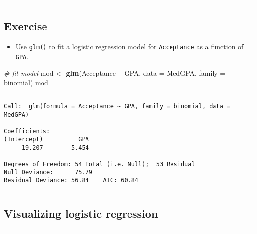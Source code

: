 \documentclass[
]{book}
\newenvironment{Shaded}{\begin{snugshade}}{\end{snugshade}}
\newcommand{\CommentTok}[1]{\textcolor[rgb]{0.56,0.35,0.01}{\textit{#1}}}
\newcommand{\DataTypeTok}[1]{\textcolor[rgb]{0.13,0.29,0.53}{#1}}
\newcommand{\KeywordTok}[1]{\textcolor[rgb]{0.13,0.29,0.53}{\textbf{#1}}}
\newcommand{\NormalTok}[1]{#1}
\newcommand{\OperatorTok}[1]{\textcolor[rgb]{0.81,0.36,0.00}{\textbf{#1}}}
\newcommand{\StringTok}[1]{\textcolor[rgb]{0.31,0.60,0.02}{#1}}
\providecommand{\tightlist}{%
  \setlength{\itemsep}{0pt}\setlength{\parskip}{0pt}}
\begin{document}
\begin{center}\rule{0.5\linewidth}{0.5pt}\end{center}

\hypertarget{exercise-14}{%
\subsection*{Exercise}\label{exercise-14}}

\begin{itemize}
\tightlist
\item
  Use \texttt{glm()} to fit a logistic regression model for \texttt{Acceptance} as a function of \texttt{GPA}.
\end{itemize}

\begin{Shaded}
\begin{Highlighting}[]
\CommentTok{# fit model}
\NormalTok{mod <-}\StringTok{ }\KeywordTok{glm}\NormalTok{(Acceptance }\OperatorTok{~}\StringTok{ }\NormalTok{GPA, }\DataTypeTok{data =}\NormalTok{ MedGPA, }\DataTypeTok{family =}\NormalTok{ binomial)}
\NormalTok{mod}
\end{Highlighting}
\end{Shaded}

\begin{verbatim}

Call:  glm(formula = Acceptance ~ GPA, family = binomial, data = MedGPA)

Coefficients:
(Intercept)          GPA  
    -19.207        5.454  

Degrees of Freedom: 54 Total (i.e. Null);  53 Residual
Null Deviance:      75.79 
Residual Deviance: 56.84    AIC: 60.84
\end{verbatim}

\begin{center}\rule{0.5\linewidth}{0.5pt}\end{center}

\hypertarget{visualizing-logistic-regression}{%
\subsection*{Visualizing logistic regression}\label{visualizing-logistic-regression}}

\begin{center}\rule{0.5\linewidth}{0.5pt}\end{center}
\end{document}
